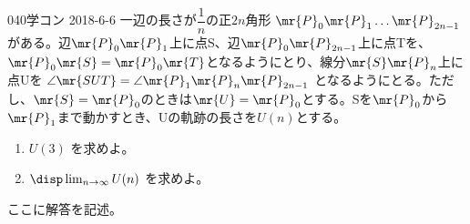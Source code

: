 \begin{prob}{040}{}{学コン 2018-6-6}
 一辺の長さが$\dfrac{1}{n}$の正$2n$角形 $\mr{P}_0\mr{P}_1\dots \mr{P}_{2n-1}$ がある。辺$\mr{P}_0\mr{P}_1$上に点S、辺$\mr{P}_0\mr{P}_{2n-1}$上に点Tを、$\mr{P}_0\mr{S}=\mr{P}_0\mr{T}$となるようにとり、線分$\mr{S}\mr{P}_n$上に点Uを $\angle\mr{SUT}=\angle\mr{P}_1\mr{P}_n\mr{P}_{2n-1}$ となるようにとる。ただし、$\mr{S}=\mr{P}_0$のときは$\mr{U}=\mr{P}_0$とする。Sを$\mr{P}_0$から$\mr{P}_1$まで動かすとき、Uの軌跡の長さを$U(n)$とする。
 \begin{enumerate}
  \item $U(3)$ を求めよ。
  \item $\disp \lim_{n\to\infty} U(n)$ を求めよ。
 \end{enumerate}
\end{prob}
ここに解答を記述。